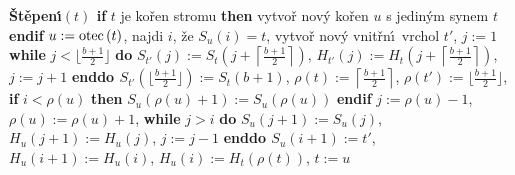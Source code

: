{\bf \v St\v epen\'\i$\left(t\right)$\newline 
if} $t$ je ko\v ren stromu {\bf then}\newline 
\phantom{---}vytvo\v r nov\'y ko\v ren $u$ s jedin\'ym synem $t$\newline 
{\bf endif}\newline 
$u:=\operatorname{otec}\left(t\right)$, najdi $i$, \v ze $S_u\left(i\right)=t$,\newline 
vytvo\v r nov\'y vnit\v rn\'\i\ vrchol $t'$, $j:=1$\newline 
{\bf while} $j<\lfloor\frac {b+1}2\rfloor$ {\bf do}\newline 
\phantom{---}$S_{t'}\left(j\right):=S_t\left(j+\left\lceil\frac {b+1}2\right\rceil \right)$, $H_{t'}\left(j\right):=H_t\left(j+\left\lceil\frac {b+1}2\right\rceil\right)$, $j:=j+1$\newline 
{\bf enddo\newline 
$S_{t'}\left(\lfloor\frac {b+1}2\rfloor \right):=S_t\left(b+1\right)$}, $\rho \left(t\right):=\left\lceil\frac {
b+1}2\right\rceil$, $\rho \left(t'\right):=\lfloor\frac {b+1}2\rfloor$,\newline 
{\bf if} $i<\rho \left(u\right)$ {\bf then} $S_u\left(\rho \left(u\right)+1\right):=S_u\left(\rho \left(u\right)\right)$ {\bf endif\newline}
$j:=\rho \left(u\right)-1$, $\rho \left(u\right):=\rho \left(u\right)+1$,\newline 
{\bf while} $j>i$ {\bf do}\newline 
\phantom{---}$S_u\left(j+1\right):=S_u\left(j\right)$, $H_u\left(j+1\right):=H_u\left(j\right)$, $j:=j-1$\newline 
{\bf enddo\newline 
$S_u\left(i+1\right):=t'$}, $H_u\left(i+1\right):=H_u\left(i\right)$, $H_u\left(i\right):=H_t\left(\rho \left(t\right)\right)$, 
$t:=u$
\medskip

